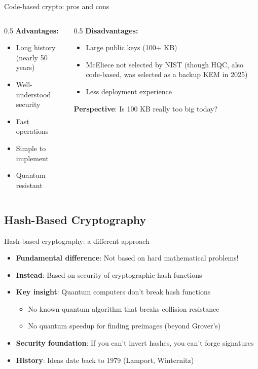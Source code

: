 \ifdefined\PRESENTATION\else\PassOptionsToClass{handout}{beamer}\fi\documentclass[aspectratio=169, lualatex]{beamer}
\begin{document}
\begin{frame}{Code-based crypto: pros and cons}
	\begin{columns}[c]
		\begin{column}{0.5\textwidth}
			\textbf{Advantages:}
			\begin{itemize}
				\item[\mycheckmark] Long history (nearly 50 years)
				\item[\mycheckmark] Well-understood security
				\item[\mycheckmark] Fast operations
				\item[\mycheckmark] Simple to implement
				\item[\mycheckmark] Quantum resistant
			\end{itemize}
		\end{column}
		\begin{column}{0.5\textwidth}
			\textbf{Disadvantages:}
			\begin{itemize}
				\item[$\times$] Large public keys (100+ KB)
				\item[$\times$] McEliece not selected by NIST (though HQC, also code-based, was selected as a backup KEM in 2025)
				\item[$\times$] Less deployment experience
			\end{itemize}

			\vspace{5mm}
			\textbf{Perspective}: Is 100 KB really too big today?
		\end{column}
	\end{columns}
\end{frame}

\subsection{Hash-Based Cryptography}

\begin{frame}{Hash-based cryptography: a different approach}
	\begin{itemize}
		\item \textbf{Fundamental difference}: Not based on hard mathematical problems!
		\item \textbf{Instead}: Based on security of cryptographic hash functions
		\item \textbf{Key insight}: Quantum computers don't break hash functions
		      \begin{itemize}
			      \item No known quantum algorithm that breaks collision resistance
			      \item No quantum speedup for finding preimages (beyond Grover's)
		      \end{itemize}
		\item \textbf{Security foundation}: If you can't invert hashes, you can't forge signatures
		\item \textbf{History}: Ideas date back to 1979 (Lamport, Winternitz)
	\end{itemize}
\end{frame}
\end{document}
